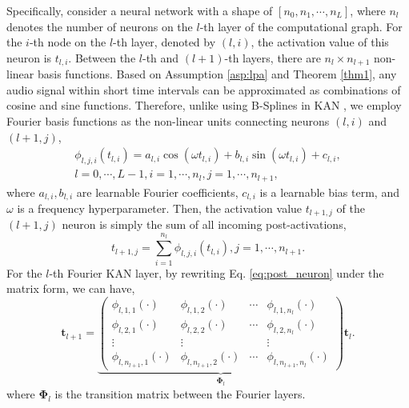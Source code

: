 \documentclass[letterpaper]{article} %
\begin{document}
Specifically, consider a neural network with a shape of $\left[n_0, n_1, \cdots, n_L\right]$, where $n_l$ denotes the number of neurons on the $l$-th layer of the computational graph. For the $i$-th node on the $l$-th layer, denoted by $(l, i)$, the activation value of this neuron is $t_{l,i}$. Between the $l$-th and $(l+1)$-th layers, there are $n_l \times n_{l+1}$ non-linear basis functions. Based on Assumption \ref{asp:lpa} and Theorem \ref{thm1}, any audio signal within short time intervals can be approximated as combinations of cosine and sine functions. Therefore, unlike using B-Splines in KAN \cite{liu2024kan}, we employ Fourier basis functions as the non-linear units connecting neurons $(l, i)$ and $(l+1, j)$,
\begin{equation}
    \label{eq:fourier_basis}
    \begin{split}
        \phi_{l, j, i} (t_{l,i}) = a_{l, i} \cos(\omega t_{l, i}) + b_{l, i} \sin(\omega t_{l, i}) + c_{l, i}, \\
        l=0, \cdots, L-1, i=1, \cdots, n_l,  j=1, \cdots, n_{l+1},
    \end{split}
\end{equation} where \(a_{l,i}, b_{l,i}\) are learnable Fourier coefficients, \(c_{l,i}\) is a learnable bias term, and \(\omega\) is a frequency hyperparameter.
Then, the activation value $t_{l+1, j}$ of the $(l+1, j)$ neuron is simply the sum of all incoming post-activations,
\begin{equation}
\label{eq:post_neuron}
t_{l+1, j}=\sum_{i=1}^{n_l} \phi_{l, j, i}\left(t_{l, i}\right), j=1, \cdots, n_{l+1} .
\end{equation}
For the $l$-th Fourier KAN layer, by rewriting Eq. \ref{eq:post_neuron} under the matrix form, we can have,  
$$
\mathbf{t}_{l+1}=\underbrace{\left(\begin{array}{cccc}
\phi_{l, 1,1}(\cdot) & \phi_{l, 1,2}(\cdot) & \cdots & \phi_{l, 1, n_l}(\cdot) \\
\phi_{l, 2,1}(\cdot) & \phi_{l, 2,2}(\cdot) & \cdots & \phi_{l, 2, n_l}(\cdot) \\
\vdots & \vdots & & \vdots \\
\phi_{l, n_{l+1}, 1}(\cdot) & \phi_{l, n_{l+1}, 2}(\cdot) & \cdots & \phi_{l, n_{l+1}, n_l}(\cdot)
\end{array}\right)}_{\boldsymbol{\Phi}_l} \mathbf{t}_l.
$$  where \(\mathbf{\Phi}_{l}\) is the transition matrix between the Fourier layers.
\end{document}
